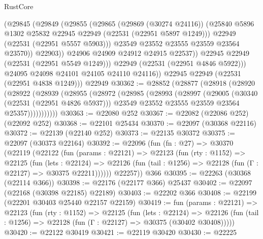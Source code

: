 \begin{lexlean}{RustCore}
\begin{coremodule}
                    (@29845
                      (@29849
                        (@29855
                          (@29865
                            (@29869 (@30274 @24116))
                            (@25840 @5896 @1302 @25832 @22945 @22949 (@22531 (@22951 @5897 @1249)))
                            @22949
                            (@22531 (@22951 @5557 @5903)))
                          @23549
                          @23552
                          @23555
                          @23559
                          @23564
                          @23570))
                      @22903))
                  @24906
                  @24909
                  @24912
                  @24915
                  @22537))
              @22945
              @22949
              (@22531 (@22951 @5549 @1249)))
            @22949
            (@22531 (@22951 @4846 @5922)))
          @24095
          @24098
          @24101
          @24105
          @24110
          @24116))
      @22945
      @22949
      (@22531 (@22951 @4838 @1249)))
    @22949
@30362 := @28852
    (@28877
      (@28918
        (@28920
          (@28922
            (@28939
              (@28955
                (@28972
                  (@28985
                    (@28993
                      (@28997
                        (@29005
                          (@30340 (@22531 (@22951 @4826 @5937)))
                          @23549
                          @23552
                          @23555
                          @23559
                          @23564
                          @25357)))))))))))
@30363 := @22080 @252
@30367 := @22082 (@22086 @252) (@22092 @252)
@30368 := @22101 @25434
@30370 := @22097 (@30368 @22116)
@30372 := @22139 (@22140 @252)
@30373 := @22135 @30372
@30375 := @22097 (@30373 @22164)
@30392 := @22096
    (fun (fn : @27) =>
    @30370
      (@22119
        (@22122
          (fun (params : @22121) =>
          @22123
            (fun (rty : @1152) =>
            @22125
              (fun (lets : @22124) =>
              @22126 (fun (tail : @1256) => @22128 (fun (Γ : @22127) => @30375 @22211))))))
        @22257))
    @366
@30395 := @22263 (@30368 (@22114 @366))
@30398 := @22176 (@22177 @366) @25437
@30402 := @22097 (@22168 (@30398 @22185) @22189)
@30403 := @22202 @366
@30408 := @22199 (@22201 @30403 @25440 @22157 @22159)
@30419 := fun (params : @22121) =>
  @22123
    (fun (rty : @1152) =>
    @22125
      (fun (lets : @22124) =>
      @22126 (fun (tail : @1256) => @22128 (fun (Γ : @22127) => @30375 (@30402 @30408)))))
@30420 := @22122 @30419
@30421 := @22119 @30420
@30430 := @22225

\end{coremodule}
\end{lexlean}

